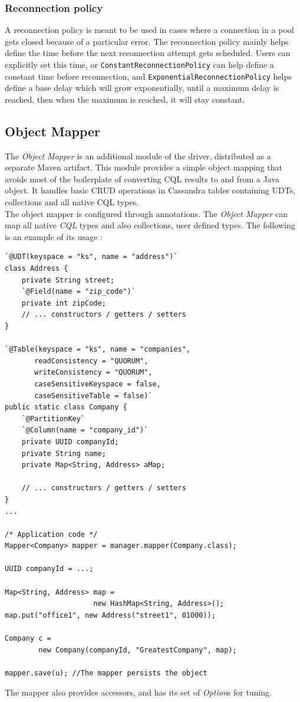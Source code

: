\documentclass[a4paper]{report}
\newcommand{\om}{\emph{Object Mapper\xspace}}
\begin{document}
\subsubsection{Reconnection policy}
A reconnection policy is meant to be used in cases where a connection in a pool gets closed because of a particular error. The reconnection policy mainly helps define the time before the next reconnection attempt gets scheduled. Users can explicitly set this time, or \verb;ConstantReconnectionPolicy; can help define a constant time before reconnection, and \verb;ExponentialReconnectionPolicy; helps define a base delay which will grow exponentially, until a maximum delay is reached, then when the maximum is reached, it will stay constant.

\subsection{Object Mapper}
The \om{} is an additional module of the driver, distributed as a separate Maven artifact. This module provides a simple object mapping that avoids most of the boilerplate of converting CQL results to and from a Java object. It handles basic CRUD operations in Cassandra tables containing UDTs, collections and all native CQL types.\\
The object mapper is configured through annotations. The \om{} can map all native \emph{CQL} types and also collections, user defined types. The following is an example of its usage : 

\begin{lstlisting}[label=om-ex-1, caption=Object Mapper example, style=Java]
`@UDT(keyspace = "ks", name = "address")`
class Address {
    private String street;
    `@Field(name = "zip_code")`
    private int zipCode;
    // ... constructors / getters / setters
}

`@Table(keyspace = "ks", name = "companies",
       readConsistency = "QUORUM",
       writeConsistency = "QUORUM",
       caseSensitiveKeyspace = false,
       caseSensitiveTable = false)`
public static class Company {
    `@PartitionKey`
    `@Column(name = "company_id")`
    private UUID companyId;
    private String name;
    private Map<String, Address> aMap;

    // ... constructors / getters / setters
}
...

/* Application code */
Mapper<Company> mapper = manager.mapper(Company.class);

UUID companyId = ...;

Map<String, Address> map = 
                     new HashMap<String, Address>();
map.put("office1", new Address("street1", 01000));

Company c = 
        new Company(companyId, "GreatestCompany", map);

mapper.save(u); //The mapper persists the object
\end{lstlisting}
The mapper also provides accessors, and has its set of \emph{Option}s for tuning.
\end{document}
